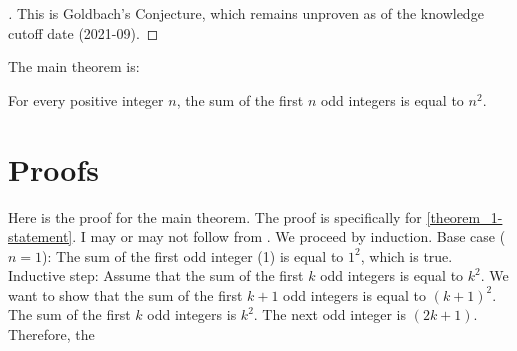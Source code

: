 \documentclass{article}
\begin{document}
\begin{proof}[\hypertarget{lemma_1-proof}Proof of \autoref{lemma_1-statement}]
\label{lemma_1-proof}
This is Goldbach's Conjecture, which remains unproven as of the knowledge cutoff date (2021-09).
\end{proof}

The main theorem is:
\begin{theorem}[theorem 1]
\label{theorem_1-statement}
For every positive integer $n$, the sum of the first $n$ odd integers is equal to $n^2$.
\end{theorem}

\section{Proofs}
\label{sec:proofs}
Here is the proof for the main theorem. The proof is specifically for \autoref{theorem_1-statement}. I may or may not follow from \cite{rudelsonSparseReconstructionFourier2008}.
We proceed by induction.
Base case ($n = 1$): The sum of the first odd integer (1) is equal to $1^2$, which is true.
Inductive step: Assume that the sum of the first $k$ odd integers is equal to $k^2$. We want to show that the sum of the first $k+1$ odd integers is equal to $(k+1)^2$.
The sum of the first $k$ odd integers is $k^2$. The next odd integer is $(2k+1)$. Therefore, the

\printbibliography
\end{document}
